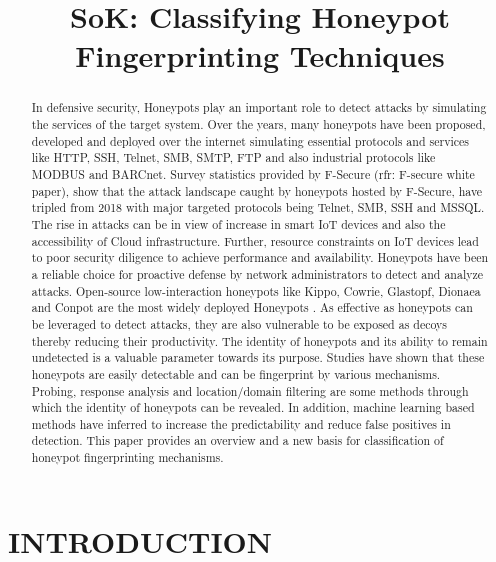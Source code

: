 \documentclass[letterpaper, 10 pt, conference]{ieeeconf}  %
\title{\LARGE \bf
SoK: Classifying Honeypot Fingerprinting Techniques
}
\begin{document}
\maketitle
\thispagestyle{empty}
\pagestyle{empty}
\begin{abstract}
In defensive security, Honeypots play an important role to detect attacks by simulating the services of the target system. Over the years, many honeypots have been proposed, developed and deployed over the internet simulating essential protocols and services like HTTP, SSH, Telnet, SMB, SMTP, FTP and also industrial protocols like MODBUS and BARCnet. Survey statistics provided by F-Secure (rfr: F-secure white paper), show that the attack landscape caught by honeypots hosted by F-Secure, have tripled from 2018 with major targeted protocols being Telnet, SMB, SSH and  MSSQL. The rise in attacks can be in view of increase in smart IoT devices and also the accessibility of Cloud infrastructure. Further, resource constraints on IoT devices lead to poor security diligence to achieve performance and availability. Honeypots have been a reliable choice for proactive defense by  network administrators to detect and analyze attacks. Open-source low-interaction honeypots like Kippo, Cowrie, Glastopf, Dionaea and Conpot are the most widely deployed Honeypots \cite{Vetterl2018}. As effective as  honeypots can be leveraged to detect attacks, they are also vulnerable to be exposed as decoys thereby reducing their productivity. The identity of honeypots and its ability to remain undetected is a valuable parameter towards its purpose. Studies have shown that these honeypots are easily detectable and can be fingerprint by various mechanisms. Probing, response analysis and  location/domain filtering are some methods through which the identity of honeypots can be revealed. In addition, machine learning based methods have inferred to increase the predictability and reduce false positives in detection. This paper provides an overview and a new basis for classification of honeypot fingerprinting mechanisms. 
\end{abstract}

\section{INTRODUCTION}

\end{document}
